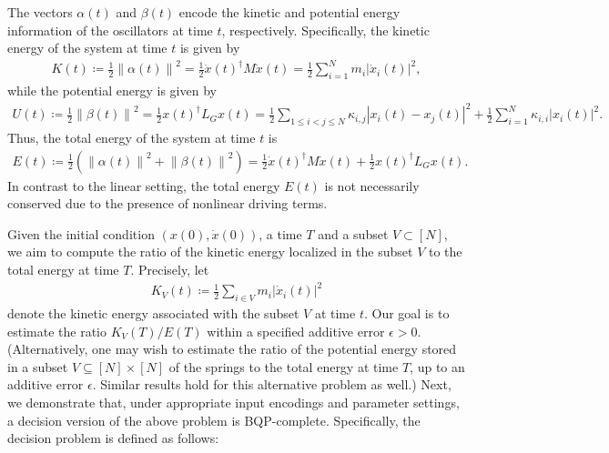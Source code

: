 \documentclass[superscriptaddress,onecolumn,nofootinbib,longbibliography,a4paper,accepted=2026-09-29]{quantumarticle}
\theoremstyle{plain}
\theoremstyle{definition}
\numberwithin{thm}{section}
\numberwithin{assumption}{section}
\numberwithin{lemma}{section}
\numberwithin{prop}{section}
\numberwithin{cor}{section}
\numberwithin{definition}{section}
\numberwithin{rmk}{section}
\numberwithin{equation}{section}
\newcommand{\abs}[1]      {\left| #1 \right|}
\newcommand{\norm}[1]     {\left\| #1 \right\|}
\newcommand{\lrb}[1]{\left ( #1 \right )}
\newcommand{\defeq}{\coloneqq}
\begin{document}
The vectors $\alpha(t)$ and $\beta(t)$ encode the kinetic and potential energy information of the oscillators at time $t$, respectively. Specifically, the kinetic energy of the system at time $t$ is given by
\begin{align}
    K(t) \defeq \frac{1}{2}\norm{\alpha(t)}^2= \frac{1}{2} \dot{x}(t)^\dagger M \dot{x}(t) = \frac{1}{2}\sum_{i=1}^N m_i \abs{\dot{x}_i(t)}^2,
\end{align}
while the potential energy is given by
\begin{align}
    U(t) \defeq \frac{1}{2}\norm{\beta(t)}^2= \frac{1}{2} x(t)^\dagger L_G x(t)=\frac{1}{2}\sum_{1\le i<j\le N}\kappa_{i,j}\abs{x_i(t)-x_j(t)}^2 + \frac{1}{2}\sum_{i=1}^N \kappa_{i,i}\abs{x_i(t)}^2.
\end{align}
Thus, the total energy of the system at time $t$ is 
\begin{align}
    E(t) \defeq  \frac{1}{2}\lrb{\norm{\alpha(t)}^2 + \norm{\beta(t)}^2}
    =\frac{1}{2}\dot{x}(t)^\dagger M \dot{x}(t) + \frac{1}{2}x(t)^\dagger L_G x(t).
    \label{eq:total_energy_nonlinear_setting}
\end{align}
In contrast to the linear setting, the total energy $E(t)$ is not necessarily conserved due to the presence of nonlinear driving terms.

Given the initial condition $(x(0), \dot{x}(0))$, a time $T$ and a subset $V \subset [N]$, we aim to compute the ratio of the kinetic energy localized in the subset $V$ to the total energy at time $T$. Precisely, let
\begin{align}
    K_V(t) \defeq \frac{1}{2}\sum_{i \in V} m_i \abs{\dot{x}_i(t)}^2
\end{align}
denote the kinetic energy associated with the subset $V$ at time $t$. Our goal is to estimate the ratio $K_V(T)/E(T)$ within a specified additive error $\epsilon>0$. (Alternatively, one may wish to estimate the ratio of the potential energy stored in a subset $V \subseteq [N] \times [N]$ of the springs to the total energy at time $T$, up to an additive error $\epsilon$. Similar results hold for this alternative problem as well.)
Next, we demonstrate that, under appropriate input encodings and parameter settings, a decision version of the above problem is BQP-complete. Specifically, the decision problem is defined as follows:
\end{document}
